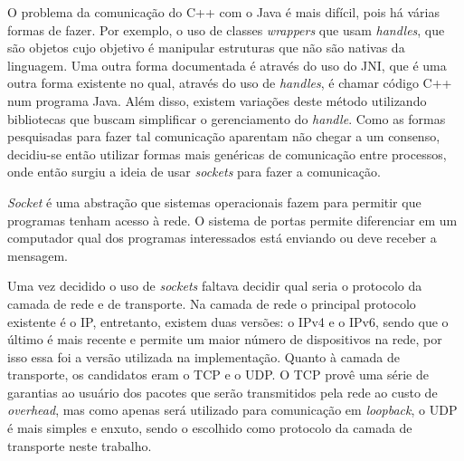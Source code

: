 O problema da comunicação do C++ com o Java é mais difícil, pois há várias formas de fazer. Por exemplo, o uso de classes \textit{wrappers} que usam \textit{handles}, que são objetos cujo objetivo é manipular estruturas que não são nativas da linguagem\cite{CppJavaHandle}. Uma outra forma documentada é através do uso do \acrfull{JNI}, que é uma outra forma existente no qual, através do uso de \textit{handles}, é chamar código C++ num programa Java\cite{CppJavaJNI}. Além disso, existem variações deste método utilizando bibliotecas que buscam simplificar o gerenciamento do \textit{handle}. Como as formas pesquisadas para fazer tal comunicação aparentam não chegar a um consenso, decidiu-se então utilizar formas mais genéricas de comunicação entre processos, onde então surgiu a ideia de usar \textit{sockets} para fazer a comunicação.

\textit{Socket} é uma abstração que sistemas operacionais fazem para permitir que programas tenham acesso à rede. O sistema de portas permite diferenciar em um computador qual dos programas interessados está enviando ou deve receber a mensagem. %

Uma vez decidido o uso de \textit{sockets} faltava decidir qual seria o protocolo da camada de rede e de transporte. Na camada de rede o principal protocolo existente é o \acrfull{IP}, entretanto, existem duas versões: o IPv4\cite{ipv4rfc} e o IPv6\cite{ipv6rfc}, sendo que o último é mais recente e permite um maior número de dispositivos na rede, por isso essa foi a versão utilizada na implementação. Quanto à camada de transporte, os candidatos eram o \acrshort{TCP}\cite{tcp_rfc} e o \acrshort{UDP}\cite{udp_rfc}. O \acrshort{TCP} provê uma série de garantias ao usuário dos pacotes que serão transmitidos pela rede ao custo de \textit{overhead}, mas como apenas será utilizado para comunicação em \textit{loopback}, o \acrshort{UDP} é mais simples e enxuto, sendo o escolhido como protocolo da camada de transporte neste trabalho.


